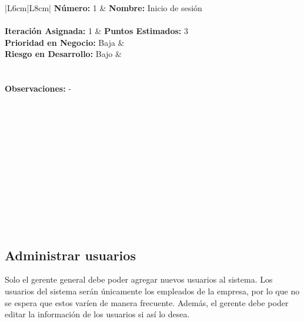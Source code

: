 \documentclass[a4paper, 12pt,twoside]{report}  %
\numberwithin{equation}{subsection} %
\begin{document}
\begin{table}[h!]
	\centering
	\begin{tabularx}
		{\textwidth}{|L{6cm}|L{8cm}|}
		\hline 
		\textbf{Número:} 1 & \textbf{Nombre:} Inicio de sesión \\ \hline
		\\ \hline
		\textbf{Iteración Asignada:} 1 & \textbf{Puntos Estimados:} 3 \\ \hline
		\textbf{Prioridad en Negocio:} Baja & \\
		 \textbf{Riesgo en Desarrollo:} Bajo & \\ \hline
		\\
		
		\hline
		\\
		
		\hline
		{\textbf{Observaciones:} - }\\
		
		\hline
	\end{tabularx}
	\caption*{Tabla A.: Refinamiento de \hyperlink{US}{US} 1.}
\end{table}
\indent
\\\\\\\\\\\\\\\\\\\\\\
\pagebreak

\subsection*{Administrar usuarios}
Solo el gerente general debe poder agregar nuevos usuarios al sistema. Los usuarios del sistema serán únicamente los empleados de la empresa, por lo que no se espera que estos varíen de manera frecuente. Además, el gerente debe poder editar la información de los usuarios  si así lo desea.
\end{document}

